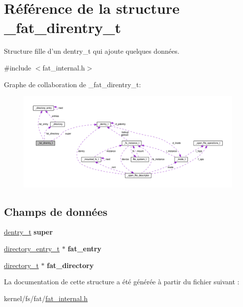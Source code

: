 \hypertarget{struct__fat__direntry__t}{\section{Référence de la structure \+\_\+fat\+\_\+direntry\+\_\+t}
\label{struct__fat__direntry__t}
}


Structure fille d'un dentry\+\_\+t qui ajoute quelques données.  




{\ttfamily \#include $<$fat\+\_\+internal.\+h$>$}



Graphe de collaboration de \+\_\+fat\+\_\+direntry\+\_\+t\+:
\nopagebreak
\begin{figure}[H]
\begin{center}
\leavevmode
\includegraphics[width=350pt]{struct__fat__direntry__t__coll__graph}
\end{center}
\end{figure}
\subsection*{Champs de données}
\begin{DoxyCompactItemize}
\item 
\hypertarget{struct__fat__direntry__t_ad5c26f850433d9c813f416d3b5325b62}{\hyperlink{vfs_8h_ade5c998c6b3f09d2cf45d0e5ef8787da}{dentry\+\_\+t} {\bfseries super}}\label{struct__fat__direntry__t_ad5c26f850433d9c813f416d3b5325b62}

\item 
\hypertarget{struct__fat__direntry__t_a17b9dd242e07822ff9bc98a6a46e8c9e}{\hyperlink{fat__internal_8h_ab6546cb0abf935a615fae20884a41818}{directory\+\_\+entry\+\_\+t} $\ast$ {\bfseries fat\+\_\+entry}}\label{struct__fat__direntry__t_a17b9dd242e07822ff9bc98a6a46e8c9e}

\item 
\hypertarget{struct__fat__direntry__t_a15f0a5d5dcfd4fac4dbc9c3c976b33df}{\hyperlink{fat__internal_8h_a04e3d213fd143d58bbabf68062bdc21c}{directory\+\_\+t} $\ast$ {\bfseries fat\+\_\+directory}}\label{struct__fat__direntry__t_a15f0a5d5dcfd4fac4dbc9c3c976b33df}

\end{DoxyCompactItemize}


La documentation de cette structure a été générée à partir du fichier suivant \+:\begin{DoxyCompactItemize}
\item 
kernel/fs/fat/\hyperlink{fat__internal_8h}{fat\+\_\+internal.\+h}\end{DoxyCompactItemize}
